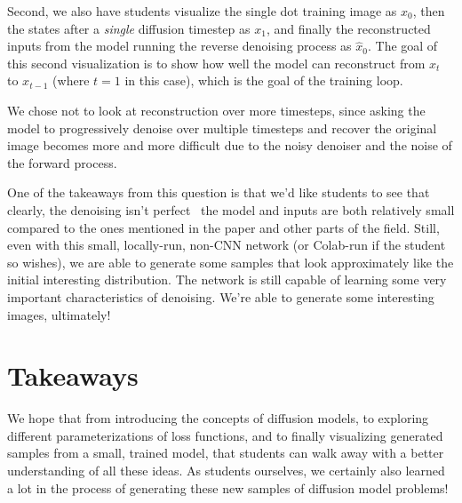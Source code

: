 \documentclass{article}
\begin{document}
\begin{enumerate}
    Second, we also have students visualize the single dot training image as $x_0$, then the states after a \textit{single} diffusion timestep as $x_1$, and finally the reconstructed inputs from the model running the reverse denoising process as $\hat{x}_0$.
    The goal of this second visualization is to show how well the model can reconstruct from $x_t$ to $x_{t-1}$ (where $t=1$ in this case), which is the goal of the training loop.
    
    We chose not to look at reconstruction over more timesteps, since asking the model to progressively denoise over multiple timesteps and recover the original image becomes more and more difficult due to the noisy denoiser and the noise of the forward process.
    
\end{enumerate}

One of the takeaways from this question is that we'd like students to see that clearly, the denoising isn't perfect \textemdash \, the model and inputs are both relatively small compared to the ones mentioned in the paper and other parts of the field. Still, even with this small, locally-run, non-CNN network (or Colab-run if the student so wishes), we are able to generate some samples that look approximately like the initial interesting distribution. The network is still capable of learning some very important characteristics of denoising. We're able to generate some interesting images, ultimately!

\section{Takeaways} %

We hope that from introducing the concepts of diffusion models, to exploring different parameterizations of loss functions, and to finally visualizing generated samples from a small, trained model, that students can walk away with a better understanding of all these ideas.
As students ourselves, we certainly also learned a lot in the process
of generating these new samples of diffusion model problems!
\end{document}
